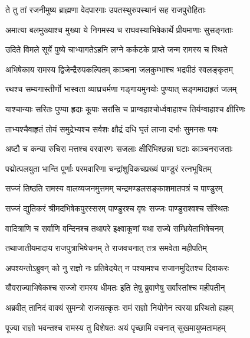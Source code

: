 
\twolineshloka
{ते तु तां रजनीमुष्य ब्राह्मणा वेदपारगाः}
{उपतस्थुरुपस्थानं सह राजपुरोहिताः} %

\twolineshloka
{अमात्या बलमुख्याश्च मुख्या ये निगमस्य च}
{राघवस्याभिषेकार्थे प्रीयमाणाः सुसङ्गताः} %

\twolineshloka
{उदिते विमले सूर्ये पुष्ये चाभ्यागतेऽहनि}
{लग्ने कर्कटके प्राप्ते जन्म रामस्य च स्थिते} %

\twolineshloka
{अभिषेकाय रामस्य द्विजेन्द्रैरुपकल्पितम्}
{काञ्चना जलकुम्भाश्च भद्रपीठं स्वलङ्कृतम्} %

\twolineshloka
{रथश्च सम्यगास्तीर्णो भास्वता व्याघ्रचर्मणा}
{गङ्गायमुनयोः पुण्यात् सङ्गमादाहृतं जलम्} %

\twolineshloka
{याश्चान्याः सरितः पुण्या ह्रदाः कूपाः सरांसि च}
{प्राग्वहाश्चोर्ध्ववाहाश्च तिर्यग्वाहाश्च क्षीरिणः} %

\twolineshloka
{ताभ्यश्चैवाहृतं तोयं समुद्रेभ्यश्च सर्वशः}
{क्षौद्रं दधि घृतं लाजा दर्भाः सुमनसः पयः} %

\twolineshloka
{अष्टौ च कन्या रुचिरा मत्तश्च वरवारणः}
{सजलाः क्षीरिभिश्छन्ना घटाः काञ्चनराजताः} %

\twolineshloka
{पद्मोत्पलयुता भान्ति पूर्णाः परमवारिणा}
{चन्द्रांशुविकचप्रख्यं पाण्डुरं रत्नभूषितम्} %

\twolineshloka
{सज्जं तिष्ठति रामस्य वालव्यजनमुत्तमम्}
{चन्द्रमण्डलसङ्काशमातपत्रं च पाण्डुरम्} %

\twolineshloka
{सज्जं द्युतिकरं श्रीमदभिषेकपुरस्सरम्}
{पाण्डुरश्च वृषः सज्जः पाण्डुराश्वश्च संस्थितः} %

\twolineshloka
{वादित्राणि च सर्वाणि वन्दिनश्च तथापरे}
{इक्ष्वाकूणां यथा राज्ये सम्भ्रियेताभिषेचनम्} %

\twolineshloka
{तथाजातीयमादाय राजपुत्राभिषेचनम्}
{ते राजवचनात् तत्र समवेता महीपतिम्} %

\twolineshloka
{अपश्यन्तोऽब्रुवन् को नु राज्ञो नः प्रतिवेदयेत्}
{न पश्यामश्च राजानमुदितश्च दिवाकरः} %

\twolineshloka
{यौवराज्याभिषेकश्च सज्जो रामस्य धीमतः}
{इति तेषु ब्रुवाणेषु सर्वांस्तांश्च महीपतीन्} %

\twolineshloka
{अब्रवीत् तानिदं वाक्यं सुमन्त्रो राजसत्कृतः}
{रामं राज्ञो नियोगेन त्वरया प्रस्थितो ह्यहम्} %

\twolineshloka
{पूज्या राज्ञो भवन्तश्च रामस्य तु विशेषतः}
{अयं पृच्छामि वचनात् सुखमायुष्मतामहम्} %

